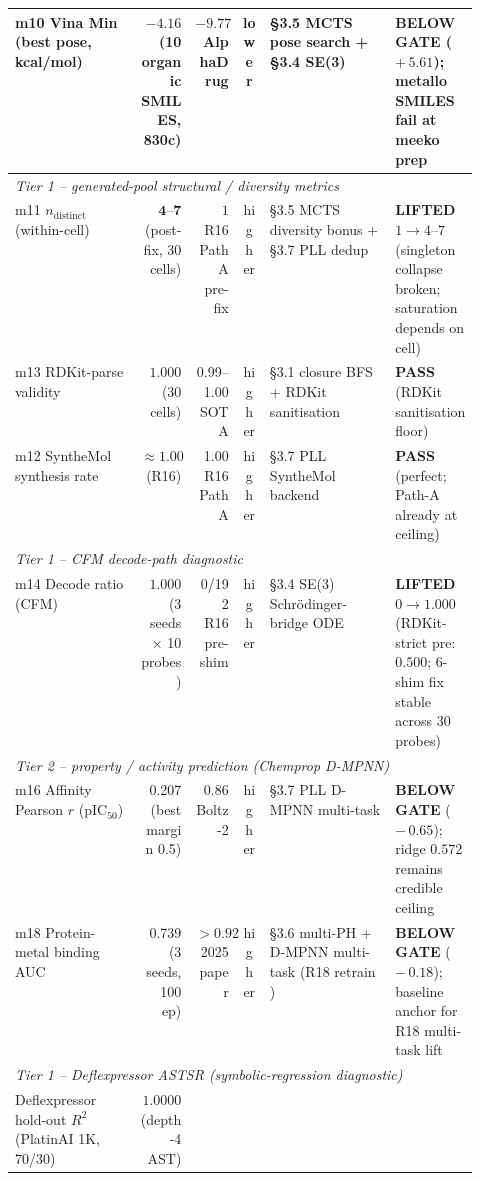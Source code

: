 \begin{table}[ht]
\begin{tabular}{p{0.27\linewidth} r r c p{0.27\linewidth} l}
m10 Vina Min (best pose, kcal/mol)
  & $-4.16$ \MEASURED{} (10 organic SMILES, 830c)
  & $-9.77$ AlphaDrug \CITEDONLY{}
  & lower
  & \S{}3.5 MCTS pose search + \S{}3.4 SE(3)
  & \textbf{BELOW GATE} ($+\,5.61$); metallo SMILES fail at meeko prep \\
\midrule
\multicolumn{6}{l}{\textit{Tier 1 -- generated-pool structural / diversity metrics}} \\
m11 $n_{\mathrm{distinct}}$ (within-cell)
  & $\mathbf{4}$--$\mathbf{7}$ \MEASURED{} (post-fix, 30 cells)
  & $1$ R16 Path A pre-fix \MEASURED{}
  & higher
  & \S{}3.5 MCTS diversity bonus + \S{}3.7 PLL dedup
  & \textbf{LIFTED} $1\!\to\!4$--$7$ (singleton collapse broken; saturation depends on cell) \\
m13 RDKit-parse validity
  & $1.000$ \MEASURED{} (30 cells)
  & 0.99--1.00 SOTA \CITEDONLY{}
  & higher
  & \S{}3.1 closure BFS + RDKit sanitisation
  & \textbf{PASS} (RDKit sanitisation floor) \\
m12 SyntheMol synthesis rate
  & $\approx 1.00$ \MEASURED{} (R16)
  & 1.00 R16 Path A \MEASURED{}
  & higher
  & \S{}3.7 PLL SyntheMol backend
  & \textbf{PASS} (perfect; Path-A already at ceiling) \\
\midrule
\multicolumn{6}{l}{\textit{Tier 1 -- CFM decode-path diagnostic}} \\
m14 Decode ratio (CFM)
  & $\mathbf{1.000}$ \MEASURED{} (3 seeds $\times$ 10 probes)
  & 0/192 R16 pre-shim \MEASURED{}
  & higher
  & \S{}3.4 SE(3) Schr\"odinger-bridge ODE
  & \textbf{LIFTED} $0\!\to\!1.000$ (RDKit-strict pre: $0.500$; 6-shim fix stable across 30 probes) \\
\midrule
\multicolumn{6}{l}{\textit{Tier 2 -- property / activity prediction (Chemprop D-MPNN)}} \\
m16 Affinity Pearson $r$ (pIC$_{50}$)
  & 0.207 \MEASURED{} (best margin 0.5)
  & 0.86 Boltz-2 \CITEDONLY{}
  & higher
  & \S{}3.7 PLL D-MPNN multi-task
  & \textbf{BELOW GATE} ($-\,0.65$); ridge $0.572$ remains credible ceiling \\
m18 Protein-metal binding AUC
  & 0.739 \MEASURED{} (3 seeds, 100 ep)
  & $> 0.92$ 2025 paper \CITEDONLY{}
  & higher
  & \S{}3.6 multi-PH + D-MPNN multi-task (R18 retrain \PROJECTED{})
  & \textbf{BELOW GATE} ($-\,0.18$); baseline anchor for R18 multi-task lift \\
\midrule
\multicolumn{6}{l}{\textit{Tier 1 -- Deflexpressor ASTSR (symbolic-regression diagnostic)}} \\
Deflexpressor hold-out $R^2$ (PlatinAI 1K, 70/30)
  & $\mathbf{1.0000}$ \MEASURED{} (depth-4 AST)

\end{tabular}
\end{table}
